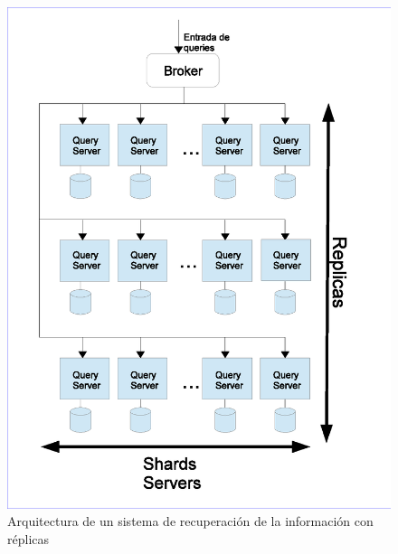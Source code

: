 \begin{figure}[tp]
\centering
\includegraphics[scale=.75]{images/sistemaIR.eps}
\caption{Arquitectura de un sistema de recuperación de la información con réplicas}
\label{fig:sistemaIR}
\end{figure}

